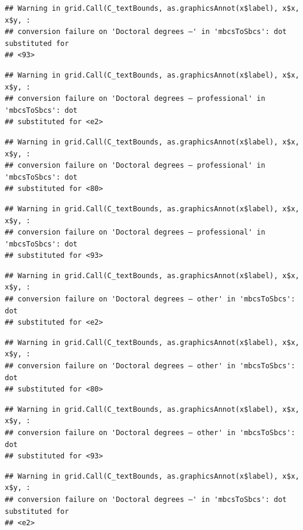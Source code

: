 \documentclass[
]{book}
\begin{document}
\begin{verbatim}
## Warning in grid.Call(C_textBounds, as.graphicsAnnot(x$label), x$x, x$y, :
## conversion failure on 'Doctoral degrees –' in 'mbcsToSbcs': dot substituted for
## <93>
\end{verbatim}

\begin{verbatim}
## Warning in grid.Call(C_textBounds, as.graphicsAnnot(x$label), x$x, x$y, :
## conversion failure on 'Doctoral degrees – professional' in 'mbcsToSbcs': dot
## substituted for <e2>
\end{verbatim}

\begin{verbatim}
## Warning in grid.Call(C_textBounds, as.graphicsAnnot(x$label), x$x, x$y, :
## conversion failure on 'Doctoral degrees – professional' in 'mbcsToSbcs': dot
## substituted for <80>
\end{verbatim}

\begin{verbatim}
## Warning in grid.Call(C_textBounds, as.graphicsAnnot(x$label), x$x, x$y, :
## conversion failure on 'Doctoral degrees – professional' in 'mbcsToSbcs': dot
## substituted for <93>
\end{verbatim}

\begin{verbatim}
## Warning in grid.Call(C_textBounds, as.graphicsAnnot(x$label), x$x, x$y, :
## conversion failure on 'Doctoral degrees – other' in 'mbcsToSbcs': dot
## substituted for <e2>
\end{verbatim}

\begin{verbatim}
## Warning in grid.Call(C_textBounds, as.graphicsAnnot(x$label), x$x, x$y, :
## conversion failure on 'Doctoral degrees – other' in 'mbcsToSbcs': dot
## substituted for <80>
\end{verbatim}

\begin{verbatim}
## Warning in grid.Call(C_textBounds, as.graphicsAnnot(x$label), x$x, x$y, :
## conversion failure on 'Doctoral degrees – other' in 'mbcsToSbcs': dot
## substituted for <93>
\end{verbatim}

\begin{verbatim}
## Warning in grid.Call(C_textBounds, as.graphicsAnnot(x$label), x$x, x$y, :
## conversion failure on 'Doctoral degrees –' in 'mbcsToSbcs': dot substituted for
## <e2>
\end{verbatim}
\end{document}
